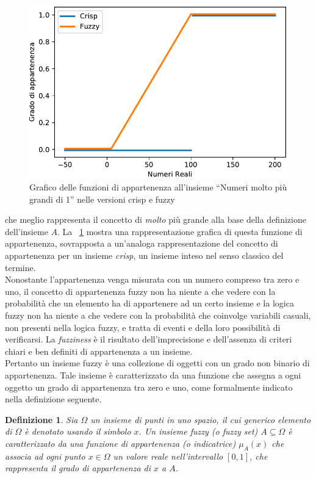 \documentclass [11pt,a4paper,twoside,openright] {book}
\newtheorem{fuzzyset}{Definizione}
\begin{document}
\begin{figure}[!b]
\centering
\includegraphics[scale=0.6]{figure/fuzzycrisp.pdf}
\caption{Grafico delle funzioni di appartenenza all'insieme ``Numeri molto più grandi di 1'' nelle versioni crisp e fuzzy \label{fuzzycrisp}}
\end{figure}che meglio rappresenta il concetto di \textit{molto} più grande alla base della definizione dell'insieme $A$. La \figurename~\ref{fuzzycrisp} mostra una rappresentazione grafica di questa funzione di appartenenza, sovrapposta a un'analoga rappresentazione del concetto di appartenenza per un insieme \textit{crisp}, un insieme inteso nel senso classico del termine.\\
Nonostante l'appartenenza venga misurata con un numero compreso tra zero e uno, il concetto di appartenenza fuzzy non ha niente a che vedere con la probabilità che un elemento ha di appartenere ad un certo insieme e la logica fuzzy non ha niente a che vedere con la probabilità che coinvolge variabili casuali, non presenti nella logica fuzzy, e tratta di eventi e della loro possibilità di verificarsi. La \textit{fuzziness} è il risultato dell'imprecisione e dell'assenza di criteri chiari e ben definiti di appartenenza a un insieme.\\
Pertanto un insieme fuzzy è una collezione di oggetti con un grado non binario di appartenenza. Tale insieme è caratterizzato da una funzione che assegna a ogni oggetto un grado di appartenenza tra zero e uno, come formalmente indicato nella definizione seguente\cite{zadeh1965fuzzy}.
\begin{fuzzyset}
Sia $\Omega$ un insieme di punti in uno spazio, il cui generico elemento di $\Omega$ è denotato usando il simbolo $x$. Un \textit{insieme fuzzy} (o \textit{fuzzy set}) $A \subseteq \Omega$ è caratterizzato da una funzione di \textit{appartenenza} (o \textit{indicatrice}) $\mu_{A}(x)$ che associa ad ogni punto $x \in \Omega$ un valore reale nell'intervallo $[0,1]$, che rappresenta il \textit{grado di appartenenza} di $x$ a $A$.
\end{fuzzyset}
\end{document}
